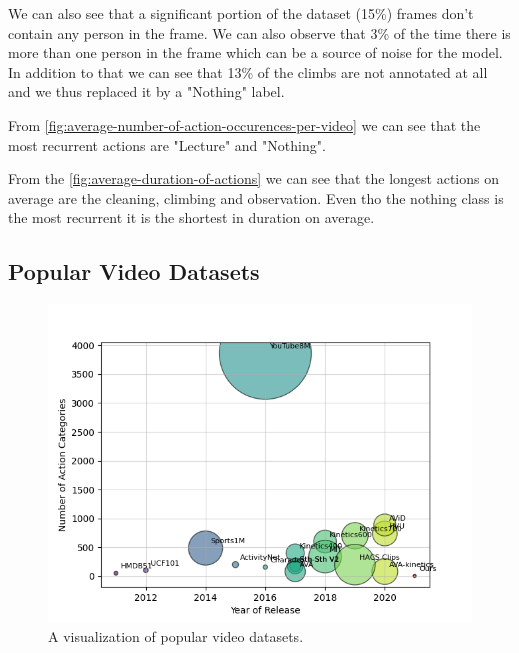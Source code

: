 We can also see that a significant portion of the dataset (15\%) frames don't contain any person in the frame. We can also observe that 3\% of the time there is more than one person in the frame which can be a source of noise for the model.
In addition to that we can see that 13\% of the climbs are not annotated at all and we thus replaced it by a "Nothing" label.

From \ref{fig:average-number-of-action-occurences-per-video} we  can see that the most recurrent actions are "Lecture" and "Nothing".

From the \ref{fig:average-duration-of-actions} we can see that the longest actions on average are the cleaning, climbing and observation. Even tho the nothing class is the most recurrent it is the shortest in duration on average.


\subsection{Popular Video Datasets}

\label{subsection:popular-video-datasets}

\begin{figure}[h!]
    \centering
    \includegraphics[width=1\linewidth]{../../assets/figures/popular-datasets.png}
    \caption{A visualization of popular video datasets.}
    \label{fig:your-label}
\end{figure}



